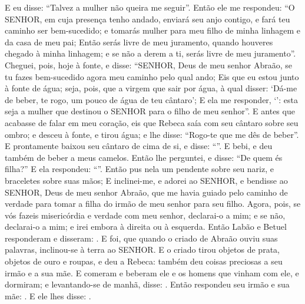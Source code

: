 {{{E eu disse: \enquote{Talvez a mulher não queira me seguir}.
Então ele me respondeu: \enquote{O SENHOR, em cuja presença tenho andado, enviará seu anjo contigo, e fará teu caminho ser bem-sucedido; e tomarás mulher para meu filho de minha linhagem e da casa de meu pai;
Então serás livre de meu juramento, quando houveres chegado à minha linhagem; e se não a derem a ti, serás livre de meu juramento}.
Cheguei, pois, hoje à fonte, e disse: \enquote{SENHOR, Deus de meu senhor Abraão, se tu fazes bem-sucedido agora meu caminho pelo qual ando;
Eis que eu estou junto à fonte de água; seja, pois, que a virgem que sair por água, à qual disser: \enquote*{Dá-me de beber, te rogo, um pouco de água de teu cântaro};
E ela me responder, \enquote*{}: esta seja a mulher que destinou o SENHOR para o filho de meu senhor}.
E antes que acabasse de falar em meu coração, eis que Rebeca saía com seu cântaro sobre seu ombro; e desceu à fonte, e tirou água; e lhe disse: \enquote{Rogo-te que me dês de beber}.
E prontamente baixou seu cântaro de cima de si, e disse: \enquote{}. E bebi, e deu também de beber a meus camelos.
Então lhe perguntei, e disse: \enquote{De quem és filha?} E ela respondeu: \enquote{}. Então pus nela um pendente sobre seu nariz, e braceletes sobre suas mãos;
E inclinei-me, e adorei ao SENHOR, e bendisse ao SENHOR, Deus de meu senhor Abraão, que me havia guiado pelo caminho de verdade para tomar a filha do irmão de meu senhor para seu filho.
Agora, pois, se vós fazeis misericórdia e verdade com meu senhor, declarai-o a mim; e se não, declarai-o a mim; e irei embora à direita ou à esquerda}.
Então Labão e Betuel responderam e disseram: .
E foi, que quando o criado de Abraão ouviu suas palavras, inclinou-se à terra ao SENHOR.
E o criado tirou objetos de prata, objetos de ouro e roupas, e deu a Rebeca: também deu coisas preciosas a seu irmão e a sua mãe.
E comeram e beberam ele e os homens que vinham com ele, e dormiram; e levantando-se de manhã, disse: .
Então respondeu seu irmão e sua mãe: .
E ele lhes disse: .
}}
